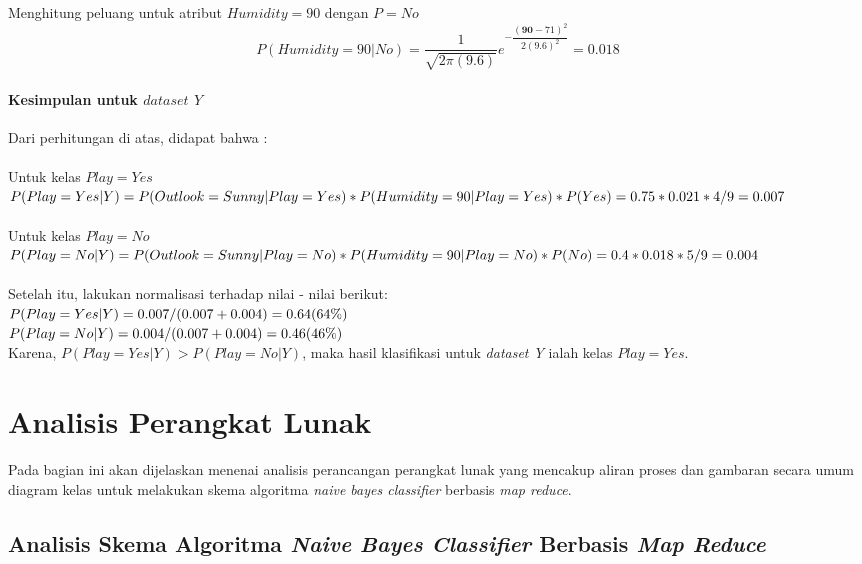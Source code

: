 	Menghitung peluang untuk atribut $Humidity=90$ dengan $P=No$
		\begin{displaymath}
			P(Humidity=90|No)
			= \dfrac{1}{\sqrt{2\pi(9.6)}}e^{-\dfrac{(\textbf{90}-71)^2}{2(9.6)^2}} 
			= 0.018
		\end{displaymath}
		
	\paragraph{Kesimpulan untuk $dataset$ $Y$}
	Dari perhitungan di atas, didapat bahwa : \\ \\
	Untuk kelas $Play=Yes$ \\
	$P(Play=Yes|Y) \\
	= P(Outlook=Sunny|Play=Yes)*P(Humidity=90|Play=Yes)*P(Yes) \\
	= 0.75 * 0.021 * 4/9 \\
	= 0.007$ \\ \\
	Untuk kelas $Play=No$ \\
	$P(Play=No|Y) \\
	= P(Outlook=Sunny|Play=No)*P(Humidity=90|Play=No)*P(No) \\
	= 0.4 * 0.018 * 5/9 \\
	= 0.004$ \\ \\
	Setelah itu, lakukan normalisasi terhadap nilai - nilai berikut: \\
	$P(Play=Yes|Y) = 0.007 / (0.007+0.004) \\
	= 0.64 (64\%)$ \\
	$P(Play=No|Y) = 0.004 / (0.007+0.004) \\
	= 0.46 (46\%)$ \\
	
	Karena, $P(Play=Yes|Y) > P(Play=No|Y)$, maka hasil klasifikasi untuk \textit{dataset Y} ialah kelas $Play=Yes$.
	

\section{Analisis Perangkat Lunak}

	Pada bagian ini akan dijelaskan menenai analisis perancangan perangkat lunak yang mencakup aliran proses dan gambaran secara umum diagram kelas untuk melakukan skema algoritma \textit{naive bayes classifier} berbasis \textit{map reduce}.

\subsection{Analisis Skema Algoritma \textit{Naive Bayes Classifier} Berbasis \textit{Map Reduce}}

